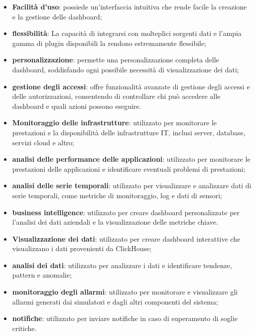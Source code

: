 \begin{itemize}
	\item \textbf{Facilità d'uso}: possiede un'interfaccia intuitiva che rende facile la creazione e la gestione delle dashboard;
	\item \textbf{flessibilità}: La capacità di integrarsi con molteplici sorgenti dati e l'ampia gamma di plugin disponibili la rendono estremamente flessibile;
	\item \textbf{personalizzazione}: permette una personalizzazione completa delle dashboard, soddisfando ogni possibile necessità di visualizzazione dei dati;
	\item \textbf{gestione degli accessi}: offre funzionalità avanzate di gestione degli accessi e delle autorizzazioni, consentendo di controllare chi può accedere alle dashboard e quali azioni possono eseguire.
\end{itemize}
\begin{itemize}
    \item \textbf{Monitoraggio delle infrastrutture}: utilizzato per monitorare le prestazioni e la disponibilità delle infrastrutture IT, inclusi server, database, servizi cloud e altro;
    \item \textbf{analisi delle performance delle applicazioni}: utilizzato per monitorare le prestazioni delle applicazioni e identificare eventuali problemi di prestazioni;
    \item \textbf{analisi delle serie temporali}: utilizzato per visualizzare e analizzare dati di serie temporali, come metriche di monitoraggio, log e dati di sensori;
    \item \textbf{business intelligence}: utilizzato per creare dashboard personalizzate per l'analisi dei dati aziendali e la visualizzazione delle metriche chiave.
\end{itemize}
\begin{itemize}
    \item \textbf{Visualizzazione dei dati}: utilizzato per creare dashboard interattive che visualizzano i dati provenienti da ClickHouse;
    \item \textbf{analisi dei dati}: utilizzato per analizzare i dati e identificare tendenze, pattern e anomalie;
    \item \textbf{monitoraggio degli allarmi}: utilizzato per monitorare e visualizzare gli allarmi generati dai simulatori e dagli altri componenti del sistema;
    \item \textbf{notifiche}: utilizzato per inviare notifiche in caso di superamento di soglie critiche.
\end{itemize}